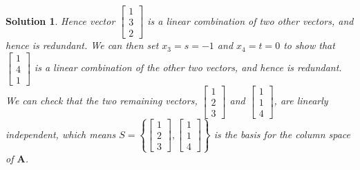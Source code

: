 \documentclass[]{book}
\newcommand{\mat}[1]{\ensuremath{\mathbf{#1}}}
\newtheorem*{solution}{Solution}
\begin{document}
\begin{example}
\begin{solution}
    Hence vector $\begin{bmatrix}1\\3\\2\end{bmatrix}$ is a linear combination of two other vectors, and hence is redundant. We can then set $x_3=s=-1$ and $x_4=t=0$ to show that $\begin{bmatrix}1 \\ 4 \\ 1\end{bmatrix}$ is a linear combination of the other two vectors, and hence is redundant. We can check that the two remaining vectors, $\begin{bmatrix}1 \\2\\3\end{bmatrix}$ and $\begin{bmatrix}1\\1\\4\end{bmatrix}$, are linearly independent, which means $S=\left\{\begin{bmatrix}1 \\2\\3\end{bmatrix},\begin{bmatrix}1\\1\\4\end{bmatrix}\right\}$ is the basis for the column space of $\mat{A}$. \hfill \qedsymbol
\end{solution}
\end{example}
\end{document}
